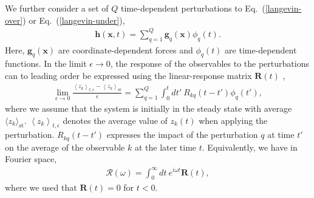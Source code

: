 \documentclass[aps,pre,twocolumn,superscriptaddress,notitlepage]{revtex4-2}
\newcommand{\av}[1]{\langle #1 \rangle}
\newcommand{\Av}[1]{\left\langle #1 \right\rangle}
\newcommand{\bmc}[1]{\bm{\mathcal{#1}}}
\renewcommand{\eqref}[1]{Eq.~(\ref{#1})}
\begin{document}
We further consider a set of $Q$ time-dependent perturbations to \eqref{langevin-over} or \eqref{langevin-under},
\begin{align}
\bm{h}(\bm{x},t) = \sum_{q=1}^Q \bm{g}_q(\bm{x}) \phi_q(t) \label{langevin-perturbed} .
\end{align}
Here, $\bm{g}_q(\bm{x})$ are coordinate-dependent forces and $\phi_q(t)$ are time-dependent functions.
In the limit $\epsilon \rightarrow 0$, the response of the observables to the perturbations can to leading order be expressed using the linear-response matrix $\bm{R}(t)$ \cite{Haenggi1982a},
\begin{align}
\lim_{\epsilon \rightarrow 0} \frac{\Av{z_k}_{t,\epsilon} - \Av{z_k}_\text{st}}{\epsilon} = \sum_{q = 1}^{Q} \int_0^t dt' \ R_{k q}(t-t') \phi_q(t') \label{response} ,
\end{align}
where we assume that the system is initially in the steady state with average $\av{z_k}_\text{st}$.
$\Av{z_k}_{t,\epsilon}$ denotes the average value of $z_k(t)$ when applying the perturbation.
$R_{kq}(t-t')$ expresses the impact of the perturbation $q$ at time $t'$ on the average of the observable $k$ at the later time $t$.
Equivalently, we have in Fourier space,
\begin{align}
\bmc{R}(\omega) = \int_0^\infty dt \ e^{i \omega t} \bm{R}(t),
\end{align}
where we used that $\bm{R}(t) = 0$ for $t < 0$.
\end{document}

